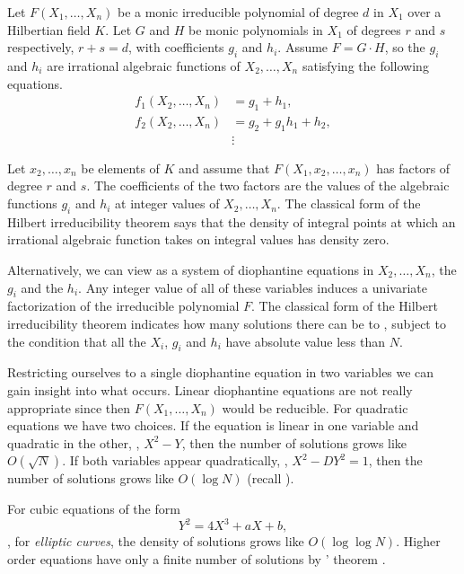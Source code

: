 Let $F(X_1, \ldots, X_n)$ be a monic irreducible polynomial of degree
$d$ in $X_1$ over a Hilbertian field $K$.  Let $G$ and $H$ be monic
polynomials in $X_1$ of degrees $r$ and $s$ respectively, $r+s = d$,
with coefficients $g_i$ and $h_i$.  Assume $F = G \cdot H$, so the
$g_i$ and $h_i$ are irrational algebraic functions of $X_2, \ldots,
X_n$ satisfying the following equations.
\begin{equation} \label{HIT:Algebraic:Eq}
\begin{aligned}
f_1(X_2, \ldots, X_n) & = g_1 + h_1, \\
f_2(X_2, \ldots, X_n) & = g_2 + g_1  h_1 + h_2, \\
& \vdots
\end{aligned}
\end{equation}

Let $x_2, \ldots, x_n$ be elements of $K$ and assume that $F(X_1, x_2,
\ldots, x_n)$ has factors of degree $r$ and $s$.  The coefficients
of the two factors are the values of the algebraic functions $g_i$ and
$h_i$ at integer values of $X_2, \ldots, X_n$.  The classical form of
the Hilbert irreducibility theorem says that the density of integral
points at which an irrational algebraic function takes on integral
values has density zero.

Alternatively, we can view  as a system of
diophantine equations in $X_2, \ldots, X_n$, the $g_i$ and the $h_i$.
Any integer value of all of these variables induces a univariate
factorization of the irreducible polynomial $F$.  The classical form
of the Hilbert irreducibility theorem indicates how many solutions
there can be to , subject to the condition
that all the $X_i$, $g_i$ and $h_i$ have absolute value less than $N$.

Restricting ourselves to a single diophantine equation in two
variables we can gain insight into what occurs.  Linear diophantine
equations are not really appropriate since then $F(X_1, \ldots, X_n)$
would be reducible.  For quadratic equations we have two choices.  If
the equation is linear in one variable and quadratic in the other,
\eg, $X^2 - Y$, then the number of solutions grows like $O(\sqrt{N})$.
If both variables appear quadratically, \eg, $X^2 - D Y^2 = 1$, then
the number of solutions grows like $O(\log N)$ (recall
). 

For cubic equations of the form 
\[
Y^2 = 4X^3 + a X + b,
\]
\ie, for {\em elliptic curves}, the density of
solutions grows like $O(\log \log N)$.  Higher order equations have
only a finite number of solutions by {\Faltings}' theorem
\cite{Faltings83,Faltings84,Faltings86}.

